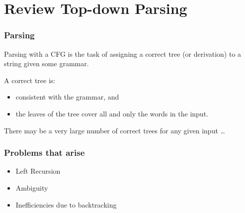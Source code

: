 
\frame{\tableofcontents}

\section{Review Top-down Parsing}




\begin{frame}[fragile]
  \frametitle{Parsing}


Parsing with a CFG is the task of assigning a correct tree (or
derivation) to a string given some grammar.

A correct tree is:
\begin{itemize}
\item consistent with the grammar, and
\item the leaves of the tree cover all and only the words in the input.
\end{itemize}

There may be a very large number of correct trees for any given input \ldots


\end{frame}



\begin{frame}[fragile]
  \frametitle{Problems that arise}

  \begin{itemize}
    
  \item Left Recursion
    
  \item Ambiguity
    
  \item Inefficiencies due to backtracking
\end{itemize}

\end{frame}

